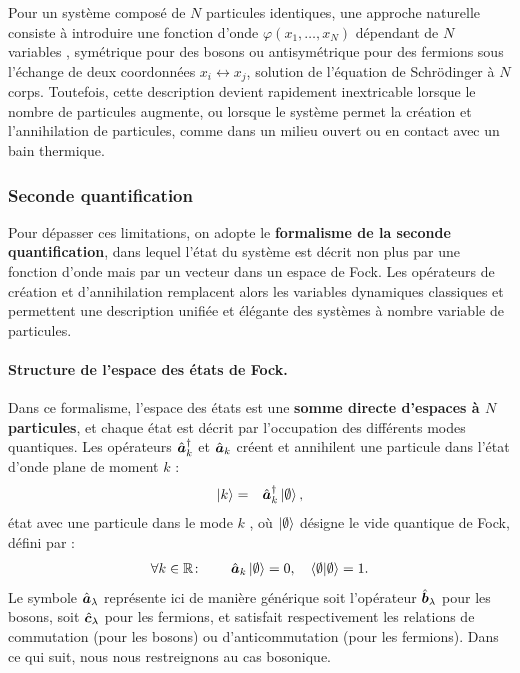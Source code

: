 Pour un système composé de $N$ particules identiques, une approche naturelle consiste à introduire une fonction d’onde $\varphi(x_1, \dots, x_N)$ dépendant de $N$ variables , symétrique pour des bosons ou antisymétrique pour des fermions sous l’échange de deux coordonnées $x_i \leftrightarrow x_j$, solution de l’équation de Schrödinger à $N$ corps. 
Toutefois, cette description devient rapidement inextricable lorsque le nombre de particules augmente, ou lorsque le système permet la création et l’annihilation de particules, comme dans un milieu ouvert ou en contact avec un bain thermique.


\subsubsection{Seconde quantification}

Pour dépasser ces limitations, on adopte le \textbf{formalisme de la seconde quantification}, dans lequel l’état du système est décrit non plus par une fonction d’onde mais par un vecteur dans un espace de Fock. Les opérateurs de création et d’annihilation remplacent alors les variables dynamiques classiques et permettent une description unifiée et élégante des systèmes à nombre variable de particules.

\paragraph{Structure de l’espace des états de Fock.}
Dans ce formalisme, l’espace des états est une {\bf somme directe d’espaces à $N$ particules}, et chaque état est décrit par l’occupation des différents modes quantiques. Les opérateurs $\hat{\bm{a}}_k^\dagger$ et $\hat{\bm{a}}_k$ créent et annihilent une particule dans l’état d’onde plane de moment $k$ :
\begin{eqnarray}
	\ket{k} & = & \operator{a}_k^\dagger \ket{\emptyset} ,%
\end{eqnarray}
état avec une particule dans le mode $k$ , où \(\ket{\emptyset}\) désigne le vide quantique de Fock, défini par :
\begin{eqnarray}
	\forall k \in \mathbb{R}\colon \qquad \hat{\bm{a}}_k \ket{\emptyset} = 0 ,\quad  \langle \emptyset \vert \emptyset \rangle = 1. \label{chap:eq.vide.fock.k}
\end{eqnarray}
Le symbole \( \hat{\bm{a}}_\lambda \) représente ici de manière générique soit l’opérateur \( \hat{\bm{b}}_\lambda \) pour les bosons, soit \( \hat{\bm{c}}_\lambda \) pour les fermions, et satisfait respectivement les relations de commutation (pour les bosons) ou d’anticommutation (pour les fermions). Dans ce qui suit, nous nous restreignons au cas bosonique.

